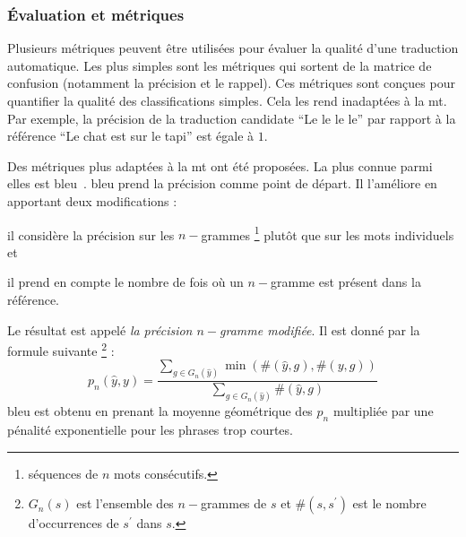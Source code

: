 \subsubsection{Évaluation et métriques}

Plusieurs métriques peuvent être utilisées pour évaluer la qualité d'une traduction automatique.
Les plus simples sont les métriques qui sortent de la matrice de confusion (notamment la précision et le rappel).
Ces métriques sont conçues pour quantifier la qualité des classifications simples.
Cela les rend inadaptées à la \gls{mt}.
Par exemple, la précision de la traduction candidate ``Le le le le'' 
par rapport à la référence ``Le chat est sur le tapi'' est égale à \(1\).

Des métriques plus adaptées à la \gls{mt} ont été proposées.
La plus connue parmi elles est \gls{bleu}~\cite{Papineni_Roukos_Ward_Zhu_2002}.
\gls{bleu} prend la précision comme point de départ.
Il l'améliore en apportant deux modifications :
\begin{enumerate*}
    \item il considère la précision sur les \(n-\)grammes%
    \footnote{séquences de \(n\) mots consécutifs.} %
    plutôt que sur les mots individuels et
    \item il prend en compte le nombre de fois où un \(n-\)gramme est présent dans la référence.
\end{enumerate*}
Le résultat est appelé \emph{la précision \(n-\)gramme modifiée}.
Il est donné par la formule suivante%
\footnote{%
    \(G_n\left(s\right)\) est l'ensemble des \(n-\)grammes de \(s\) et \(\#(s, s^\prime)\) est le nombre d'occurrences de \(s^\prime\) dans \(s\).} :%
\begin{equation}
    \label{eq:mod-ng-prec}
    p_n\left(\hat{y}, y\right) = 
    \frac{\sum\limits_{g \in G_n\left(\hat{y}\right)} \min{\left(\#(\hat{y}, g), \#(y, g)\right)}}
    {\sum\limits_{g \in G_n\left(\hat{y}\right)} \#(\hat{y}, g)}
\end{equation}
\gls{bleu} est obtenu en prenant la moyenne géométrique des \(p_n\) 
multipliée par une pénalité exponentielle pour les phrases trop courtes.